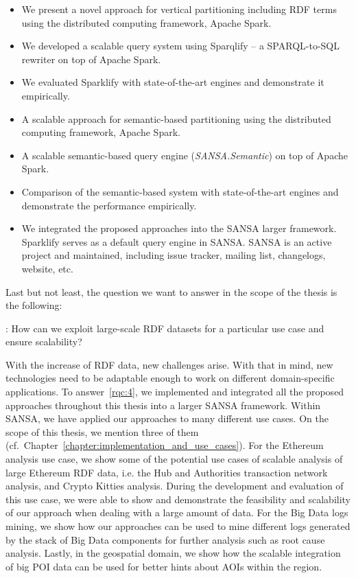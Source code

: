 \begin{itemize}
 \item We present a novel approach for vertical partitioning including \gls{RDF} terms using the distributed computing framework, Apache Spark.
 \item We developed a scalable query system using Sparqlify -- a SPARQL-to-SQL rewriter on top of Apache Spark.
 \item We evaluated Sparklify with state-of-the-art engines and demonstrate it empirically.
 \item A scalable approach for semantic-based partitioning using the distributed computing framework, Apache Spark.
 \item A scalable semantic-based query engine (\textit{SANSA.Semantic}) on top of Apache Spark.
 \item Comparison of the semantic-based system with state-of-the-art engines and demonstrate the performance empirically.
 \item We integrated the proposed approaches into the SANSA larger framework.
 Sparklify serves as a default query engine in SANSA.
 SANSA is an active project and maintained, including issue tracker, mailing list, changelogs, website, etc.
\end{itemize}

Last but not least, the question we want to answer in the scope of the thesis is the following:

\begin{tcolorbox}
\textbf{\rqNr[RQ4]\label{rqc:4}}: How can we exploit large-scale \gls{RDF} datasets for a particular use case and ensure scalability?
\end{tcolorbox}

With the increase of \gls{RDF} data, new challenges arise.
With that in mind, new technologies need to be adaptable enough to work on different domain-specific applications.
To answer~\ref{rqc:4}, we implemented and integrated all the proposed approaches throughout this thesis into a larger SANSA framework.
Within SANSA, we have applied our approaches to many different use cases.
On the scope of this thesis, we mention three of them (cf.\ Chapter~\ref{chapter:implementation_and_use_cases}).
For the Ethereum analysis use case, we show some of the potential use cases of scalable analysis of large Ethereum \gls{RDF} data, i.e. the Hub and Authorities transaction network analysis, and Crypto Kitties analysis.
During the development and evaluation of this use case, we were able to show and demonstrate the feasibility and scalability of our approach when dealing with a large amount of data.
For the Big Data logs mining, we show how our approaches can be used to mine different logs generated by the stack of Big Data components for further analysis such as root cause analysis.
Lastly, in the geospatial domain, we show how the scalable integration of big \gls{POI} data can be used for better hints about \gls{AOI}s within the region.



